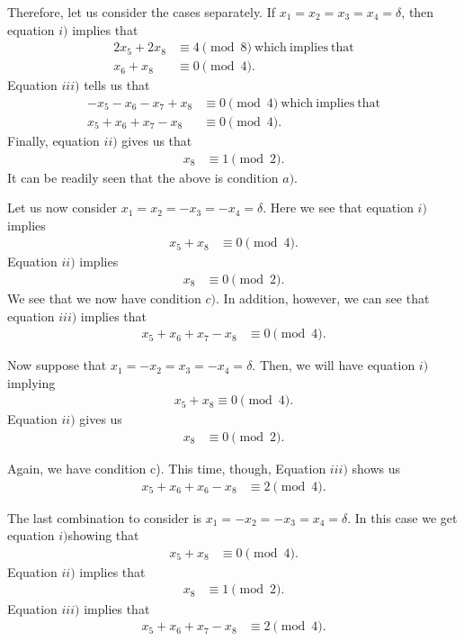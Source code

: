 \documentclass[11pt]{report}
\begin{document}
Therefore, let us consider the cases separately. If $x_1 = x_2 = x_3 
= x_4 = \delta$, then equation $i)$
implies that 
\begin{align*}
2x_5 + 2x_8 &\equiv 4\pmod{8} \mathrm{\ which\ implies\ that}\\
x_6+x_8&\equiv0\pmod{4}.
\end{align*}
Equation $iii)$ tells us that
\begin{align*}
-x_5-x_6-x_7+x_8&\equiv 0\pmod{4} \mathrm{\ which\ implies\ that}\\
x_5+x_6+x_7-x_8&\equiv 0\pmod{4}.
\end{align*}
Finally, equation $ii)$ gives us that
\begin{align*}
x_8&\equiv 1\pmod{2}.
\end{align*}
It can be readily seen that the above is condition $a)$.

Let us now consider $x_1=x_2= -x_3=-x_4=\delta$. Here we see that equation $i)$ 
implies
\begin{align*}
x_5+x_8&\equiv 0\pmod{4}.
\end{align*}
Equation $ii)$ implies
\begin{align*}
x_8&\equiv 0\pmod{2}.
\end{align*}
We see that we now have condition $c)$. In addition, however, we 
can see that equation $iii)$
implies that
\begin{align*}
x_5+x_6+x_7-x_8&\equiv 0\pmod{4}.
\end{align*}

Now suppose that $x_1 = -x_2 = x_3 = -x_4 = \delta$. Then, we will have 
equation $i)$ implying
\begin{align*}
x_5+x_8\equiv 0\pmod{4}.
\end{align*}
Equation $ii)$ gives us
\begin{align*}
x_8&\equiv 0\pmod{2}.
\end{align*}


Again, we have condition c). This time, though, Equation $iii)$
shows us
\begin{align*}
x_5+x_6+x_6-x_8&\equiv2\pmod{4}.
\end{align*}

The last combination to consider is $x_1=-x_2=-x_3=x_4=\delta$.
In this case we get equation $i)$showing that
\begin{align*}
x_5+x_8&\equiv 0 \pmod{4}.
\end{align*}
Equation $ii)$ implies that
\begin{align*}
x_8&\equiv 1 \pmod{2}.
\end{align*}
Equation $iii)$ implies that
\begin{align*}
x_5+x_6+x_7-x_8&\equiv 2 \pmod{4}.
\end{align*}
\end{document}

